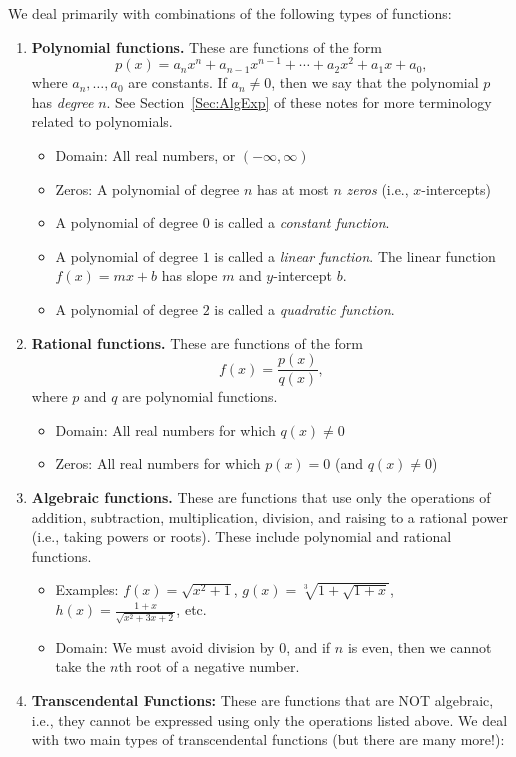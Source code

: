\documentclass[letterpaper,12pt,oneside]{book}
\theoremstyle{definition}
\begin{document}
{We deal primarily with combinations of the following types of functions:
\begin{enumerate}[label=\arabic*.]
\item \textbf{Polynomial functions.} These are functions of the form
\[
p(x)=a_nx^n+a_{n-1}x^{n-1}+\cdots+a_2x^2+a_1x+a_0,
\]
where $a_n,\ldots,a_0$ are constants. If $a_n\neq 0$, then we say that the polynomial $p$ has \emph{degree} $n$.  See Section~\ref{Sec:AlgExp} of these notes for more terminology related to polynomials.
\begin{itemize}
\item Domain: All real numbers, or $(-\infty,\infty)$
\item Zeros: A polynomial of degree $n$ has at most $n$ \emph{zeros} (i.e., $x$-intercepts)
\item A polynomial of degree $0$ is called a \emph{constant function}.
\item A polynomial of degree $1$ is called a \emph{linear function}.  The linear function $f(x)=mx+b$ has slope $m$ and $y$-intercept $b$.
\item A polynomial of degree $2$ is called a \emph{quadratic function}. 
\end{itemize}
\item \textbf{Rational functions.}  These are functions of the form 
\[
f(x)=\frac{p(x)}{q(x)},
\]
where $p$ and $q$ are polynomial functions.
\begin{itemize}
\item Domain: All real numbers for which $q(x)\neq 0$
\item Zeros: All real numbers for which $p(x)=0$ (and $q(x)\neq 0$)
\end{itemize}
\item \textbf{Algebraic functions.} These are functions that use only the operations of addition, subtraction, multiplication, division, and raising to a rational power (i.e., taking powers or roots).  These include polynomial and rational functions.
\begin{itemize}
\item Examples: $f(x)=\sqrt{x^2+1}$, $g(x)=\sqrt[3]{1+\sqrt{1+x}}$, $h(x)=\frac{1+x}{\sqrt{x^2+3x+2}}$, etc.
\item Domain: We must avoid division by $0$, and if $n$ is even, then we cannot take the $n$th root of a negative number.
\end{itemize}
\item \textbf{Transcendental Functions:} These are functions that are NOT algebraic, i.e., they cannot be expressed using only the operations listed above.  We deal with two main types of transcendental functions (but there are many more!):

\end{enumerate}}
\end{document}
